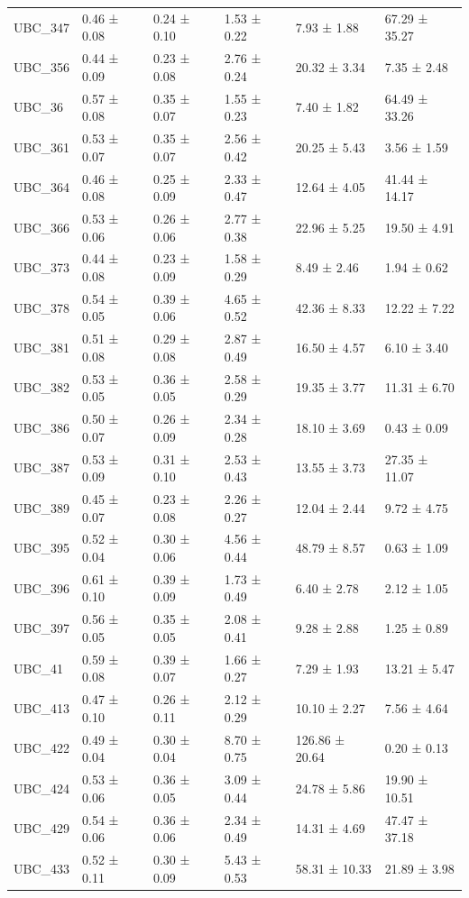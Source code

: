 \begin{tabular}{llllll}
UBC_347 & 0.46 ± 0.08 & 0.24 ± 0.10 & 1.53 ± 0.22 & 7.93 ± 1.88 & 67.29 ± 35.27 \\
UBC_356 & 0.44 ± 0.09 & 0.23 ± 0.08 & 2.76 ± 0.24 & 20.32 ± 3.34 & 7.35 ± 2.48 \\
UBC_36 & 0.57 ± 0.08 & 0.35 ± 0.07 & 1.55 ± 0.23 & 7.40 ± 1.82 & 64.49 ± 33.26 \\
UBC_361 & 0.53 ± 0.07 & 0.35 ± 0.07 & 2.56 ± 0.42 & 20.25 ± 5.43 & 3.56 ± 1.59 \\
UBC_364 & 0.46 ± 0.08 & 0.25 ± 0.09 & 2.33 ± 0.47 & 12.64 ± 4.05 & 41.44 ± 14.17 \\
UBC_366 & 0.53 ± 0.06 & 0.26 ± 0.06 & 2.77 ± 0.38 & 22.96 ± 5.25 & 19.50 ± 4.91 \\
UBC_373 & 0.44 ± 0.08 & 0.23 ± 0.09 & 1.58 ± 0.29 & 8.49 ± 2.46 & 1.94 ± 0.62 \\
UBC_378 & 0.54 ± 0.05 & 0.39 ± 0.06 & 4.65 ± 0.52 & 42.36 ± 8.33 & 12.22 ± 7.22 \\
UBC_381 & 0.51 ± 0.08 & 0.29 ± 0.08 & 2.87 ± 0.49 & 16.50 ± 4.57 & 6.10 ± 3.40 \\
UBC_382 & 0.53 ± 0.05 & 0.36 ± 0.05 & 2.58 ± 0.29 & 19.35 ± 3.77 & 11.31 ± 6.70 \\
UBC_386 & 0.50 ± 0.07 & 0.26 ± 0.09 & 2.34 ± 0.28 & 18.10 ± 3.69 & 0.43 ± 0.09 \\
UBC_387 & 0.53 ± 0.09 & 0.31 ± 0.10 & 2.53 ± 0.43 & 13.55 ± 3.73 & 27.35 ± 11.07 \\
UBC_389 & 0.45 ± 0.07 & 0.23 ± 0.08 & 2.26 ± 0.27 & 12.04 ± 2.44 & 9.72 ± 4.75 \\
UBC_395 & 0.52 ± 0.04 & 0.30 ± 0.06 & 4.56 ± 0.44 & 48.79 ± 8.57 & 0.63 ± 1.09 \\
UBC_396 & 0.61 ± 0.10 & 0.39 ± 0.09 & 1.73 ± 0.49 & 6.40 ± 2.78 & 2.12 ± 1.05 \\
UBC_397 & 0.56 ± 0.05 & 0.35 ± 0.05 & 2.08 ± 0.41 & 9.28 ± 2.88 & 1.25 ± 0.89 \\
UBC_41 & 0.59 ± 0.08 & 0.39 ± 0.07 & 1.66 ± 0.27 & 7.29 ± 1.93 & 13.21 ± 5.47 \\
UBC_413 & 0.47 ± 0.10 & 0.26 ± 0.11 & 2.12 ± 0.29 & 10.10 ± 2.27 & 7.56 ± 4.64 \\
UBC_422 & 0.49 ± 0.04 & 0.30 ± 0.04 & 8.70 ± 0.75 & 126.86 ± 20.64 & 0.20 ± 0.13 \\
UBC_424 & 0.53 ± 0.06 & 0.36 ± 0.05 & 3.09 ± 0.44 & 24.78 ± 5.86 & 19.90 ± 10.51 \\
UBC_429 & 0.54 ± 0.06 & 0.36 ± 0.06 & 2.34 ± 0.49 & 14.31 ± 4.69 & 47.47 ± 37.18 \\
UBC_433 & 0.52 ± 0.11 & 0.30 ± 0.09 & 5.43 ± 0.53 & 58.31 ± 10.33 & 21.89 ± 3.98 \\

\end{tabular}
